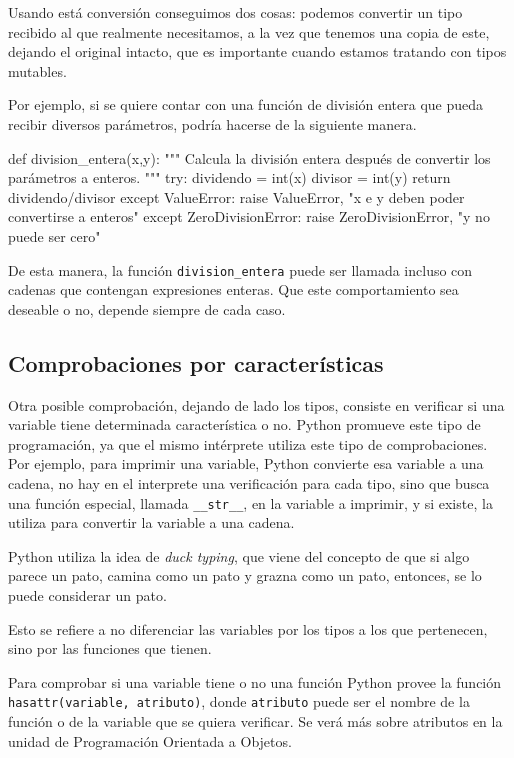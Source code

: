 Usando está conversión conseguimos dos cosas: podemos convertir un tipo
recibido al que realmente necesitamos, a la vez que tenemos una copia de
este, dejando el original intacto, que es importante cuando estamos
tratando con tipos mutables.

Por ejemplo, si se quiere contar con una función de división entera que
pueda recibir diversos parámetros, podría hacerse de la siguiente manera.

\begin{codigo-python-sn}
def division_entera(x,y):
    """ Calcula la división entera después de convertir los parámetros a
    enteros. """
    try:
        dividendo = int(x)
        divisor = int(y)
        return dividendo/divisor
    except ValueError:
        raise ValueError, "x e y deben poder convertirse a enteros"
    except ZeroDivisionError:
        raise ZeroDivisionError, "y no puede ser cero"
\end{codigo-python-sn}

De esta manera, la función \lstinline!division_entera! puede ser llamada
incluso con cadenas que contengan expresiones enteras. Que este
comportamiento sea deseable o no, depende siempre de cada caso.

\subsection{Comprobaciones por características}

Otra posible comprobación, dejando de lado los tipos, consiste en verificar
si una variable tiene determinada característica o no. Python promueve este
tipo de programación, ya que el mismo intérprete utiliza este tipo de
comprobaciones. Por ejemplo, para imprimir una variable, Python convierte
esa variable a una cadena, no hay en el interprete una verificación para
cada tipo, sino que busca una función especial, llamada
\lstinline!__str__!, en la variable a imprimir, y si existe, la utiliza
para convertir la variable a una cadena.

\begin{sabias_que}
Python utiliza la idea de {\it duck typing}, que viene del concepto de que
si algo parece un pato, camina como un pato y grazna como un pato,
entonces, se lo puede considerar un pato. 

Esto se refiere a no diferenciar las variables por los tipos a los que
pertenecen, sino por las funciones que tienen.
\end{sabias_que}

Para comprobar si una variable tiene o no una función Python provee la
función \lstinline!hasattr(variable, atributo)!, donde \lstinline!atributo!
puede ser el nombre de la función o de la variable que se quiera verificar.
Se verá más sobre atributos en la unidad de Programación Orientada a
Objetos.

